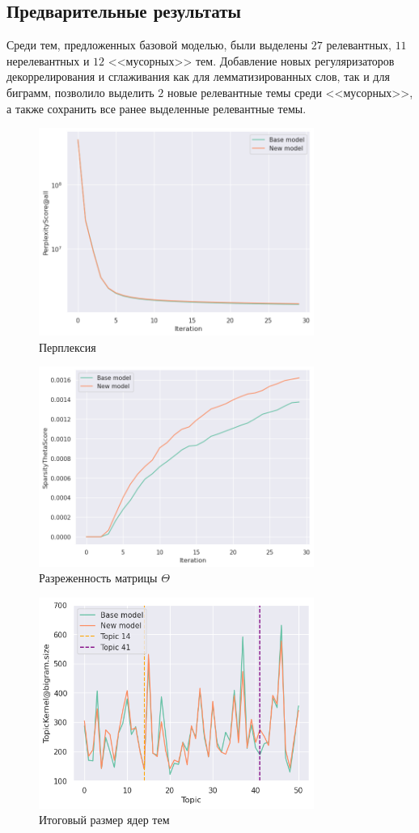 \documentclass{article}
\begin{document}
\subsection{Предварительные результаты}

Среди тем, предложенных базовой моделью, были выделены $27$ релевантных, $11$ нерелевантных и $12$ <<мусорных>> тем.
Добавление новых регуляризаторов декоррелирования и сглаживания как для лемматизированных слов, так и для биграмм, позволило выделить $2$ новые релевантные темы среди <<мусорных>>, а также сохранить все ранее выделенные релевантные темы.

\begin{figure}[h]
\includegraphics[width=9cm]{figures/perplexity_all.png}
\centering
\caption{Перплексия}
\end{figure}

\begin{figure}[h]
\includegraphics[width=9cm]{figures/sparsity_theta.png}
\centering
\caption{Разреженность матрицы $\Theta$}
\end{figure}

\begin{figure}[h]
\includegraphics[width=9cm]
{figures/topickernel_bigram_size.png}
\centering
\caption{Итоговый размер ядер тем}
\end{figure}
\end{document}
